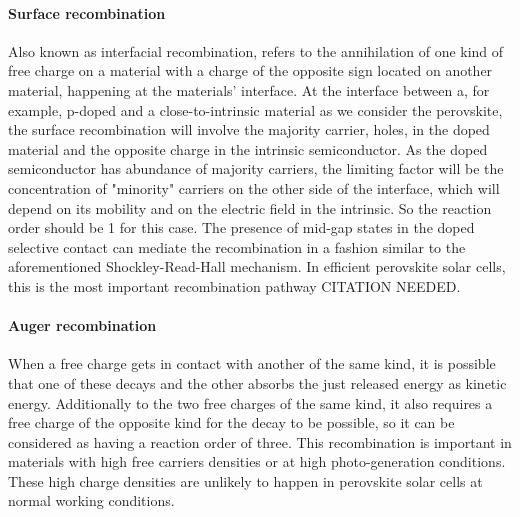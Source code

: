 		\paragraph{Surface recombination}\label{intro_surface_recombination}
		Also known as interfacial recombination, refers to the annihilation of one kind of free charge on a material with a charge of the opposite sign located on another material, happening at the materials' interface.
		At the interface between a, for example, p-doped and a close-to-intrinsic material as we consider the perovskite, the surface recombination will involve the majority carrier, holes, in the doped material and the opposite charge in the intrinsic semiconductor.
		As the doped semiconductor has abundance of majority carriers, the limiting factor will be the concentration of "minority" carriers on the other side of the interface, which will depend on its mobility and on the electric field in the intrinsic.
		So the reaction order should be 1 for this case.
		The presence of mid-gap states in the doped selective contact can mediate the recombination in a fashion similar to the aforementioned Shockley-Read-Hall mechanism.
		In efficient perovskite solar cells, this is the most important recombination pathway CITATION NEEDED.

		\paragraph{Auger recombination}
		When a free charge gets in contact with another of the same kind, it is possible that one of these decays and the other absorbs the just released energy as kinetic energy.
		Additionally to the two free charges of the same kind, it also requires a free charge of the opposite kind for the decay to be possible, so it can be considered as having a reaction order of three.
		This recombination is important in materials with high free carriers densities or at high photo-generation conditions.
		These high charge densities are unlikely to happen in perovskite solar cells at normal working conditions.

